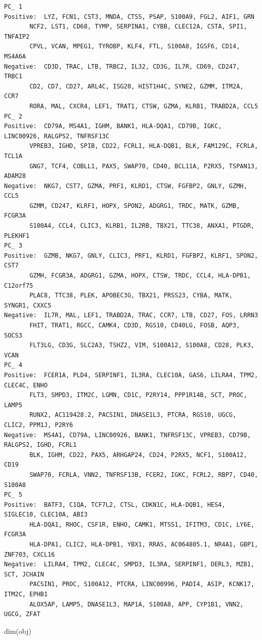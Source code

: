 \documentclass[
  letterpaper,
  DIV=11,
  numbers=noendperiod]{scrartcl}
\newenvironment{Shaded}{\begin{snugshade}}{\end{snugshade}}
\newcommand{\FunctionTok}[1]{\textcolor[rgb]{0.28,0.35,0.67}{#1}}
\newcommand{\NormalTok}[1]{\textcolor[rgb]{0.00,0.23,0.31}{#1}}
\begin{document}
\begin{verbatim}
PC_ 1 
Positive:  LYZ, FCN1, CST3, MNDA, CTSS, PSAP, S100A9, FGL2, AIF1, GRN 
       NCF2, LST1, CD68, TYMP, SERPINA1, CYBB, CLEC12A, CSTA, SPI1, TNFAIP2 
       CPVL, VCAN, MPEG1, TYROBP, KLF4, FTL, S100A8, IGSF6, CD14, MS4A6A 
Negative:  CD3D, TRAC, LTB, TRBC2, IL32, CD3G, IL7R, CD69, CD247, TRBC1 
       CD2, CD7, CD27, ARL4C, ISG20, HIST1H4C, SYNE2, GZMM, ITM2A, CCR7 
       RORA, MAL, CXCR4, LEF1, TRAT1, CTSW, GZMA, KLRB1, TRABD2A, CCL5 
PC_ 2 
Positive:  CD79A, MS4A1, IGHM, BANK1, HLA-DQA1, CD79B, IGKC, LINC00926, RALGPS2, TNFRSF13C 
       VPREB3, IGHD, SPIB, CD22, FCRL1, HLA-DQB1, BLK, FAM129C, FCRLA, TCL1A 
       GNG7, TCF4, COBLL1, PAX5, SWAP70, CD40, BCL11A, P2RX5, TSPAN13, ADAM28 
Negative:  NKG7, CST7, GZMA, PRF1, KLRD1, CTSW, FGFBP2, GNLY, GZMH, CCL5 
       GZMM, CD247, KLRF1, HOPX, SPON2, ADGRG1, TRDC, MATK, GZMB, FCGR3A 
       S100A4, CCL4, CLIC3, KLRB1, IL2RB, TBX21, TTC38, ANXA1, PTGDR, PLEKHF1 
PC_ 3 
Positive:  GZMB, NKG7, GNLY, CLIC3, PRF1, KLRD1, FGFBP2, KLRF1, SPON2, CST7 
       GZMH, FCGR3A, ADGRG1, GZMA, HOPX, CTSW, TRDC, CCL4, HLA-DPB1, C12orf75 
       PLAC8, TTC38, PLEK, APOBEC3G, TBX21, PRSS23, CYBA, MATK, SYNGR1, CXXC5 
Negative:  IL7R, MAL, LEF1, TRABD2A, TRAC, CCR7, LTB, CD27, FOS, LRRN3 
       FHIT, TRAT1, RGCC, CAMK4, CD3D, RGS10, CD40LG, FOSB, AQP3, SOCS3 
       FLT3LG, CD3G, SLC2A3, TSHZ2, VIM, S100A12, S100A8, CD28, PLK3, VCAN 
PC_ 4 
Positive:  FCER1A, PLD4, SERPINF1, IL3RA, CLEC10A, GAS6, LILRA4, TPM2, CLEC4C, ENHO 
       FLT3, SMPD3, ITM2C, LGMN, CD1C, P2RY14, PPP1R14B, SCT, PROC, LAMP5 
       RUNX2, AC119428.2, PACSIN1, DNASE1L3, PTCRA, RGS10, UGCG, CLIC2, PPM1J, P2RY6 
Negative:  MS4A1, CD79A, LINC00926, BANK1, TNFRSF13C, VPREB3, CD79B, RALGPS2, IGHD, FCRL1 
       BLK, IGHM, CD22, PAX5, ARHGAP24, CD24, P2RX5, NCF1, S100A12, CD19 
       SWAP70, FCRLA, VNN2, TNFRSF13B, FCER2, IGKC, FCRL2, RBP7, CD40, S100A8 
PC_ 5 
Positive:  BATF3, C1QA, TCF7L2, CTSL, CDKN1C, HLA-DQB1, HES4, SIGLEC10, CLEC10A, ABI3 
       HLA-DQA1, RHOC, CSF1R, ENHO, CAMK1, MTSS1, IFITM3, CD1C, LY6E, FCGR3A 
       HLA-DPA1, CLIC2, HLA-DPB1, YBX1, RRAS, AC064805.1, NR4A1, GBP1, ZNF703, CXCL16 
Negative:  LILRA4, TPM2, CLEC4C, SMPD3, IL3RA, SERPINF1, DERL3, MZB1, SCT, JCHAIN 
       PACSIN1, PROC, S100A12, PTCRA, LINC00996, PADI4, ASIP, KCNK17, ITM2C, EPHB1 
       ALOX5AP, LAMP5, DNASE1L3, MAP1A, S100A8, APP, CYP1B1, VNN2, UGCG, ZFAT 
\end{verbatim}

\begin{Shaded}
\begin{Highlighting}[]
\FunctionTok{dim}\NormalTok{(obj)}
\end{Highlighting}
\end{Shaded}
\end{document}
